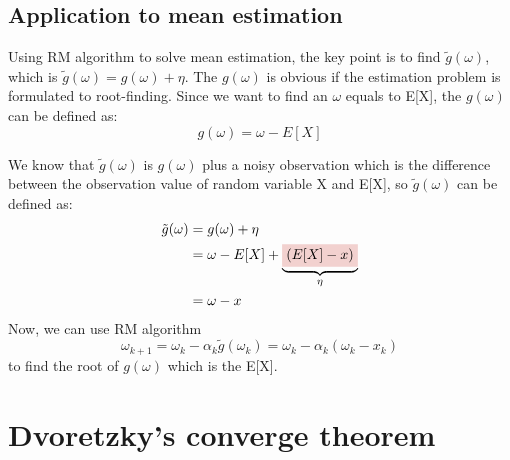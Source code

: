 \subsection{Application to mean estimation}

  Using RM algorithm to solve mean estimation, the key point is to find $\tilde{g}(\omega)$, which is
  $\tilde{g}(\omega)=g(\omega)+\eta$. The $g(\omega)$ is obvious if the estimation problem is formulated to root-finding.
  Since we want to find an $\omega$ equals to E[X], the $g(\omega)$ can be defined as:
  \begin{equation*}
    g(\omega) = \omega - E[X]
  \end{equation*}
  \par We know that $\tilde{g}(\omega)$ is $g(\omega)$ plus a noisy observation which is the difference between the
  observation value of random variable X and E[X], so $\tilde{g}(\omega)$ can be defined as:
  \begin{align*}
    \tilde{g}(\omega) & = g(\omega) + \eta                                                            \\
                      & = \omega - E[X] + \underbrace{\colorbox{myred!20!white}{$(E[X] - x)$}}_{\eta} \\
                      & = \omega - x
  \end{align*}
  Now, we can use RM algorithm
  \begin{equation*}
    \omega_{k+1} = \omega_{k} - \alpha_{k}\tilde{g}(\omega_{k}) = \omega_{k} - \alpha_{k}(\omega_{k}-x_{k})
  \end{equation*}
  to find the root of $g(\omega)$ which is the E[X]. 

\section{Dvoretzky's converge theorem}


